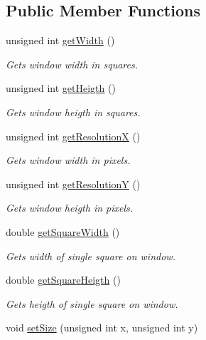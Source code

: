 \subsection*{Public Member Functions}
\begin{DoxyCompactItemize}
\item 
unsigned int \mbox{\hyperlink{class_graphic_manager_a09e9d90c3751312e83609221ed653f70}{get\+Width}} ()
\begin{DoxyCompactList}\small\item\em Gets window width in squares. \end{DoxyCompactList}\item 
unsigned int \mbox{\hyperlink{class_graphic_manager_a6e55c77b8bd70d820920090db8ad666b}{get\+Heigth}} ()
\begin{DoxyCompactList}\small\item\em Gets window heigth in squares. \end{DoxyCompactList}\item 
unsigned int \mbox{\hyperlink{class_graphic_manager_a59523c70187862b7ccd0fd73b65cbbf0}{get\+ResolutionX}} ()
\begin{DoxyCompactList}\small\item\em Gets window width in pixels. \end{DoxyCompactList}\item 
unsigned int \mbox{\hyperlink{class_graphic_manager_a8c9a8735220370a81101d32c73595bc3}{get\+ResolutionY}} ()
\begin{DoxyCompactList}\small\item\em Gets window heigth in pixels. \end{DoxyCompactList}\item 
double \mbox{\hyperlink{class_graphic_manager_acdd4dc3b2d89b0f76e04f66aaac2d78b}{get\+Square\+Width}} ()
\begin{DoxyCompactList}\small\item\em Gets width of single square on window. \end{DoxyCompactList}\item 
double \mbox{\hyperlink{class_graphic_manager_a2499a6f320e67a7955d7fdf96eda794d}{get\+Square\+Heigth}} ()
\begin{DoxyCompactList}\small\item\em Gets heigth of single square on window. \end{DoxyCompactList}\item 
void \mbox{\hyperlink{class_graphic_manager_a0d177abd3a98449126938af3c076b128}{set\+Size}} (unsigned int x, unsigned int y)

\end{DoxyCompactItemize}
